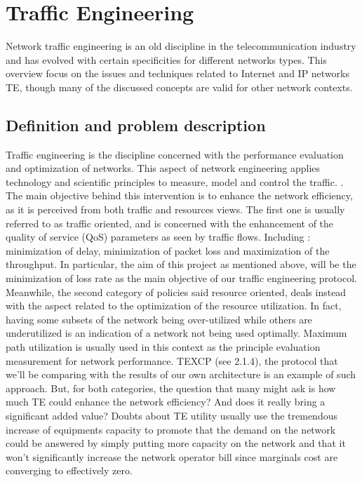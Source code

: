 \section{Traffic Engineering}


Network traffic engineering is an old discipline in the telecommunication industry and has evolved with certain specificities for different networks types. This overview focus on the issues and techniques related to Internet and IP networks TE, though many of the discussed concepts are valid for other network contexts.

\subsection{Definition and problem description}


	Traffic engineering is the discipline concerned with the performance evaluation  and optimization of  networks.  This aspect of network engineering applies technology and scientific principles to measure, model and control the traffic.  \cite {RFC 3272}.  \\
The main objective behind this intervention is to enhance the network efficiency, as it is perceived  from both  traffic and  resources views. The first one is usually referred to as traffic oriented, and is concerned with the enhancement of the quality of service (QoS) parameters as seen by traffic flows. Including : minimization of delay, minimization of packet loss and maximization of the throughput. In particular, the aim of this project as mentioned above, will be the minimization of loss rate as the main objective of our traffic engineering protocol.\\
Meanwhile, the second category of policies said resource oriented,  deals instead with the aspect related to the optimization of the resource utilization. In fact, having some subsets of the network being over-utilized while others are underutilized is an indication of a network not being used optimally. Maximum path utilization is usually used in this context as the principle evaluation measurement for network performance. TEXCP (see 2.1.4), the protocol that we'll be comparing with the results of our own architecture is an example of such approach. 
But, for both categories, the question that many might ask is how much TE could enhance the network efficiency? And does it really bring a significant added value? Doubts about TE utility usually use the tremendous increase of equipments capacity to promote that the demand on the network could be answered by simply putting more capacity on the network and that it won't significantly increase the network operator bill since marginals cost are converging to effectively zero.
